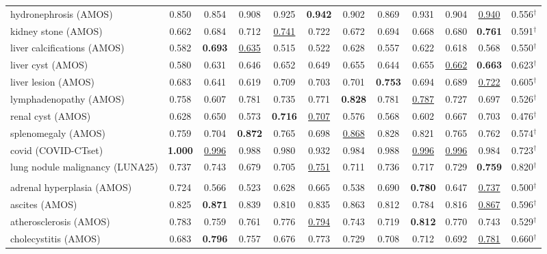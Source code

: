 \begin{minipage}{\textwidth}
{\begin{tabular}{@{}lccccccccccc@{}}
hydronephrosis (AMOS) & 0.850 & 0.854 & 0.908 & 0.925 & \textbf{0.942} & 0.902 & 0.869 & 0.931 & 0.904 & \underline{0.940} & 0.556$^{\dagger}$ \\
kidney stone (AMOS) & 0.662 & 0.684 & 0.712 & \underline{0.741} & 0.722 & 0.672 & 0.694 & 0.668 & 0.680 & \textbf{0.761} & 0.591$^{\dagger}$ \\
liver calcifications (AMOS) & 0.582 & \textbf{0.693} & \underline{0.635} & 0.515 & 0.522 & 0.628 & 0.557 & 0.622 & 0.618 & 0.568 & 0.550$^{\dagger}$ \\
liver cyst (AMOS) & 0.580 & 0.631 & 0.646 & 0.652 & 0.649 & 0.655 & 0.644 & 0.655 & \underline{0.662} & \textbf{0.663} & 0.623$^{\dagger}$ \\
liver lesion (AMOS) & 0.683 & 0.641 & 0.619 & 0.709 & 0.703 & 0.701 & \textbf{0.753} & 0.694 & 0.689 & \underline{0.722} & 0.605$^{\dagger}$ \\
lymphadenopathy (AMOS) & 0.758 & 0.607 & 0.781 & 0.735 & 0.771 & \textbf{0.828} & 0.781 & \underline{0.787} & 0.727 & 0.697 & 0.526$^{\dagger}$ \\
renal cyst (AMOS) & 0.628 & 0.650 & 0.573 & \textbf{0.716} & \underline{0.707} & 0.576 & 0.568 & 0.602 & 0.667 & 0.703 & 0.476$^{\dagger}$ \\
splenomegaly (AMOS) & 0.759 & 0.704 & \textbf{0.872} & 0.765 & 0.698 & \underline{0.868} & 0.828 & 0.821 & 0.765 & 0.762 & 0.574$^{\dagger}$ \\
covid (COVID-CTset) & \textbf{1.000} & \underline{0.996} & 0.988 & 0.980 & 0.932 & 0.984 & 0.988 & \underline{0.996} & \underline{0.996} & 0.984 & 0.723$^{\dagger}$ \\
lung nodule malignancy (LUNA25) & 0.737 & 0.743 & 0.679 & 0.705 & \underline{0.751} & 0.711 & 0.736 & 0.717 & 0.729 & \textbf{0.759} & 0.820$^{\dagger}$ \\
\addlinespace
\multicolumn{12}{@{}l}{\textit{joint}} \\
adrenal hyperplasia (AMOS) & 0.724 & 0.566 & 0.523 & 0.628 & 0.665 & 0.538 & 0.690 & \textbf{0.780} & 0.647 & \underline{0.737} & 0.500$^{\dagger}$ \\
ascites (AMOS) & 0.825 & \textbf{0.871} & 0.839 & 0.810 & 0.835 & 0.863 & 0.812 & 0.784 & 0.816 & \underline{0.867} & 0.596$^{\dagger}$ \\
atherosclerosis (AMOS) & 0.783 & 0.759 & 0.761 & 0.776 & \underline{0.794} & 0.743 & 0.719 & \textbf{0.812} & 0.770 & 0.743 & 0.529$^{\dagger}$ \\
cholecystitis (AMOS) & 0.683 & \textbf{0.796} & 0.757 & 0.676 & 0.773 & 0.729 & 0.708 & 0.712 & 0.692 & \underline{0.781} & 0.660$^{\dagger}$ \\

\end{tabular}}
\end{minipage}
